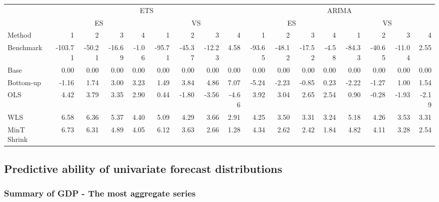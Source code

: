 \documentclass[]{article}
\begin{document}
\begin{table}[H]
\centering
\begin{tabular}{l|r|r|r|r|r|r|r|r|r|r|r|r|r|r|r|r}
\hline
\multicolumn{1}{c|}{ } & \multicolumn{8}{|c|}{ETS} & \multicolumn{8}{|c}{ARIMA} \\
\cline{2-9} \cline{10-17}
\multicolumn{1}{c|}{ } & \multicolumn{4}{|c|}{ES} & \multicolumn{4}{|c|}{VS} & \multicolumn{4}{|c|}{ES} & \multicolumn{4}{|c}{VS} \\
\cline{2-5} \cline{6-9} \cline{10-13} \cline{14-17}
Method & 1 & 2 & 3 & 4 & 1 & 2 & 3 & 4 & 1 & 2 & 3 & 4 & 1 & 2 & 3 & 4\\
\hline
Benchmark & -103.71 & -50.21 & -16.69 & -1.06 & -95.71 & -45.37 & -12.23 & 4.58 & -93.65 & -48.12 & -17.52 & -4.58 & -84.33 & -40.65 & -11.04 & 2.55\\
\hline
Base & 0.00 & 0.00 & 0.00 & 0.00 & 0.00 & 0.00 & 0.00 & 0.00 & 0.00 & 0.00 & 0.00 & 0.00 & 0.00 & 0.00 & 0.00 & 0.00\\
\hline
Bottom-up & -1.16 & 1.74 & 3.00 & 3.23 & 1.49 & 3.84 & 4.86 & 7.07 & -5.24 & -2.23 & -0.85 & 0.23 & -2.22 & -1.27 & 1.00 & 1.54\\
\hline
OLS & 4.42 & 3.79 & 3.35 & 2.90 & 0.44 & -1.80 & -3.56 & -4.66 & 3.92 & 3.04 & 2.65 & 2.54 & 0.90 & -0.28 & -1.93 & -2.19\\
\hline
WLS & 6.58 & 6.36 & 5.37 & 4.40 & 5.09 & 4.29 & 3.66 & 2.91 & 4.25 & 3.50 & 3.31 & 3.24 & 5.18 & 4.26 & 3.53 & 3.31\\
\hline
MinT Shrink & 6.73 & 6.31 & 4.89 & 4.05 & 6.12 & 3.63 & 2.66 & 1.28 & 4.34 & 2.62 & 2.42 & 1.84 & 4.82 & 4.11 & 3.28 & 2.54\\
\hline
\end{tabular}
\end{table}

\subsection{Predictive ability of univariate forecast
distributions}\label{predictive-ability-of-univariate-forecast-distributions}

\subsubsection{Summary of GDP - The most aggregate
series}\label{summary-of-gdp---the-most-aggregate-series-1}
\end{document}
